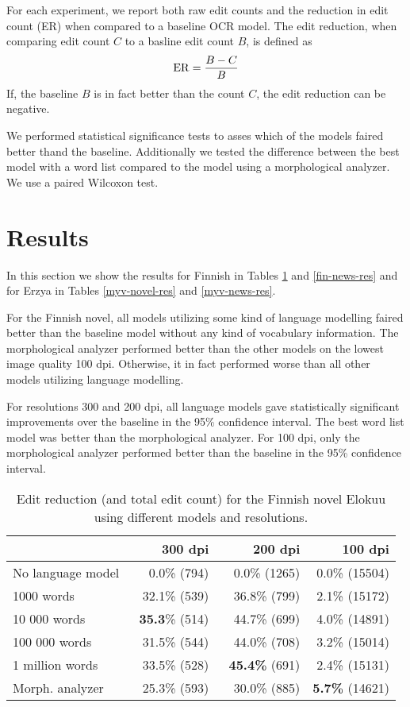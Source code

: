 \documentclass[b5paper]{article}
\begin{document}
For each experiment, we report both raw edit counts and the reduction
in edit count (ER) when compared to a baseline OCR model. The edit
reduction, when comparing edit count $C$ to a basline edit count $B$,
is defined as
$${\rm ER} = \frac{B - C}{B}$$
If, the baseline $B$ is in fact better than the count $C$, the edit
reduction can be negative.

We performed statistical significance tests to asses which of the
models faired better thand the baseline. Additionally we tested the
difference between the best model with a word list compared to the
model using a morphological analyzer. We use a paired Wilcoxon test.

\section{Results}

In this section we show the results for Finnish in Tables
\ref{fin-novel-res} and \ref{fin-news-res} and for Erzya in Tables
\ref{myv-novel-res} and \ref{myv-news-res}. 

For the Finnish novel, all models utilizing some kind of language
modelling faired better than the baseline model without any kind of
vocabulary information. The morphological analyzer performed better
than the other models on the lowest image quality 100 dpi. Otherwise,
it in fact performed worse than all other models utilizing language
modelling.

For resolutions 300 and 200 dpi, all language models gave statistically significant improvements over the baseline in the 95\% confidence interval. The best word list model was better than the morphological analyzer. For 100 dpi, only the morphological analyzer performed better than the baseline in the 95\% confidence interval.

\begin{table}[!htb]
\begin{center}
\begin{tabular}{lrrr}
\hline 
                  & 300 dpi & 200 dpi & 100 dpi \\
\hline 
No language model & ~0.0\% (794)          & ~0.0\% (1265)          & 0.0\% (15504) \\
1000 words        & ~32.1\% (539)  & ~36.8\% (799)        & 2.1\% (15172)    \\
10 000 words      & {\bf ~35.3}\% (514)  & ~44.7\%  (699)  & 4.0\% (14891)   \\
100 000 words     & ~31.5\% (544)   & ~44.0\%  (708)  & 3.2\%  (15014)  \\
1 million words   & ~33.5\% (528)   & {\bf ~45.4\%} (691)  & 2.4\% (15131)        \\
Morph. analyzer   & ~25.3\% (593)    & ~30.0\% (885)     & {\bf 5.7\%} (14621)  \\
\hline 
\end{tabular}
\caption{Edit reduction (and total edit count) for the Finnish novel Elokuu using different models and resolutions.}\label{fin-novel-res}
\end{center}
\end{table}
\end{document}
